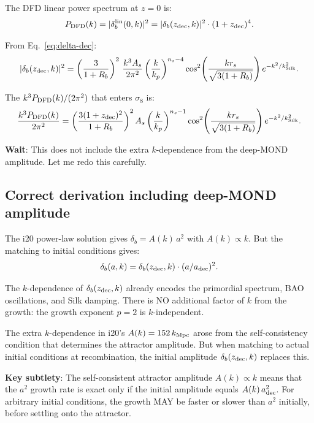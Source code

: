 \documentclass[11pt]{article}
\newcommand{\kSilk}{k_{\rm Silk}}
\begin{document}
The DFD linear power spectrum at $z = 0$ is:
\begin{equation}
P_{\rm DFD}(k) = |\delta_b^{\rm lin}(0, k)|^2
= |\delta_b(z_{\rm dec}, k)|^2\cdot(1+z_{\rm dec})^4.
\end{equation}

From Eq.~\eqref{eq:delta-dec}:
\begin{equation}
|\delta_b(z_{\rm dec}, k)|^2
= \left(\frac{3}{1+R_b}\right)^2\,\frac{k^3 A_s}{2\pi^2}
\left(\frac{k}{k_p}\right)^{n_s-4}
\cos^2\!\left(\frac{k r_s}{\sqrt{3(1+R_b)}}\right)
e^{-k^2/\kSilk^2}.
\end{equation}

The $k^3 P_{\rm DFD}(k)/(2\pi^2)$ that enters $\sigma_8$ is:
\begin{equation}
\frac{k^3 P_{\rm DFD}(k)}{2\pi^2}
= \left(\frac{3(1+z_{\rm dec})^2}{1+R_b}\right)^2
A_s\left(\frac{k}{k_p}\right)^{n_s-1}
\cos^2\!\left(\frac{k r_s}{\sqrt{3(1+R_b)}}\right)
e^{-k^2/\kSilk^2}.
\label{eq:Pk-DFD}
\end{equation}

\textbf{Wait}: This does not include the extra $k$-dependence from
the deep-MOND amplitude. Let me redo this carefully.

\subsection{Correct derivation including deep-MOND amplitude}

The i20 power-law solution gives $\delta_b = A(k)\,a^2$ with
$A(k) \propto k$. But the matching to initial conditions gives:
\begin{equation}
\delta_b(a, k) = \delta_b(z_{\rm dec}, k)\cdot(a/a_{\rm dec})^2.
\end{equation}

The $k$-dependence of $\delta_b(z_{\rm dec}, k)$ already encodes
the primordial spectrum, BAO oscillations, and Silk damping.
There is NO additional factor of $k$ from the growth: the growth
exponent $p = 2$ is $k$-independent.

The extra $k$-dependence in i20's $A(k) = 152\,k_{\rm Mpc}$ arose
from the self-consistency condition that determines the attractor
amplitude. But when matching to actual initial conditions at
recombination, the initial amplitude $\delta_b(z_{\rm dec}, k)$
replaces this.

\textbf{Key subtlety}: The self-consistent attractor amplitude
$A(k) \propto k$ means that the $a^2$ growth rate is exact only
if the initial amplitude equals $A(k)\,a_{\rm dec}^2$. For
arbitrary initial conditions, the growth MAY be faster or slower
than $a^2$ initially, before settling onto the attractor.
\end{document}
